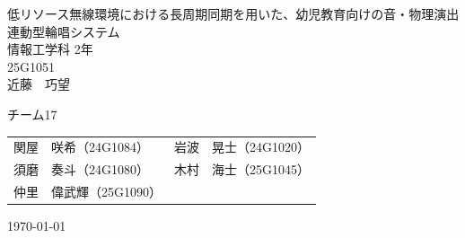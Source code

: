 \documentclass[uplatex,dvipdfmx]{jlreq}
\begin{document}
\begin{titlepage}
\vspace*{1cm}
\centering
\Huge\textsf{低リソース無線環境における長周期同期を用いた、幼児教育向けの音・物理演出連動型輪唱システム
}\\[2cm]
\Large\textsf{情報工学科 2年}\\
\Large\textsf{25G1051}\\[5pt]
\huge\textsf{近藤　巧望}

\vspace*{1cm}
\Large\sffamily
\begin{itembox}[c]{チーム17}
\centering
\begin{tabular}{ll}
関屋　咲希（24G1084）&
岩波　晃士（24G1020）\\
須磨　奏斗（24G1080）&
木村　海士（25G1045）\\
仲里　偉武輝（25G1090）&\\
\end{tabular}
\end{itembox}

\vspace*{1cm}
\Large\textsf{\today}
\end{titlepage}
\clearpage












\appendix
\renewcommand{\thefigure}{A.\arabic{figure}} %
\renewcommand{\thetable}{A.\arabic{table}}   %
\renewcommand{\theequation}{\Alph{section}.\arabic{equation}} %


\end{document}
